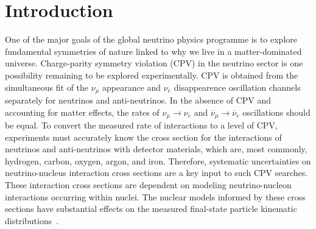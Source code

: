 \section{Introduction}
One of the major goals of the global neutrino physics programme is to explore fundamental symmetries of nature linked to why we live in a matter-dominated universe. 
Charge-parity symmetry violation (CPV) in the neutrino sector is one possibility remaining to be explored experimentally. 
CPV is obtained from the simultaneous fit of the $\nu_{\mu}$ appearance and $\nu_e$ disappearence oscillation channels separately for neutrinos and anti-neutrinos.
In the absence of CPV and accounting for matter effects, the rates of $\nu_{\mu}\!\rightarrow\!\nu_e$ and $\overline{\nu}_{\mu}\!\rightarrow\!\overline{\nu}_e$ oscillations should be equal.
To convert the measured rate of interactions to a level of CPV, experiments must accurately know the cross section for the interactions of neutrinos and anti-neutrinos with detector materials, which are, most commonly, hydrogen, carbon, oxygen, argon, and iron. 
Therefore, systematic uncertainties on neutrino-nucleus interaction cross sections are a key input to such CPV searches.  
These interaction cross sections are dependent on modeling neutrino-nucleon interactions occurring within nuclei. 
The nuclear models informed by these cross sections have substantial effects on the measured final-state particle kinematic distributions~\cite{Mosel:2016cwa}.

